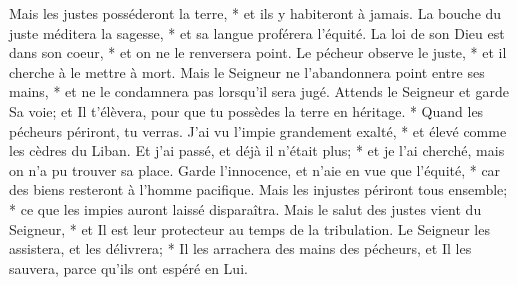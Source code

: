 Mais les justes posséderont la terre, * et ils y habiteront à jamais.
La bouche du juste méditera la sagesse, * et sa langue proférera l'équité.
La loi de son Dieu est dans son coeur, * et on ne le renversera point.
Le pécheur observe le juste, * et il cherche à le mettre à mort.
Mais le Seigneur ne l'abandonnera point entre ses mains, * et ne le condamnera pas lorsqu'il sera jugé.
Attends le Seigneur et garde Sa voie; et Il t'élèvera, pour que tu possèdes la terre en héritage. * Quand les pécheurs périront, tu verras.
J'ai vu l'impie grandement exalté, * et élevé comme les cèdres du Liban.
Et j'ai passé, et déjà il n'était plus; * et je l'ai cherché, mais on n'a pu trouver sa place.
Garde l'innocence, et n'aie en vue que l'équité, * car des biens resteront à l'homme pacifique.
Mais les injustes périront tous ensemble; * ce que les impies auront laissé disparaîtra.
Mais le salut des justes vient du Seigneur, * et Il est leur protecteur au temps de la tribulation.
Le Seigneur les assistera, et les délivrera; * Il les arrachera des mains des pécheurs, et Il les sauvera, parce qu'ils ont espéré en Lui.

